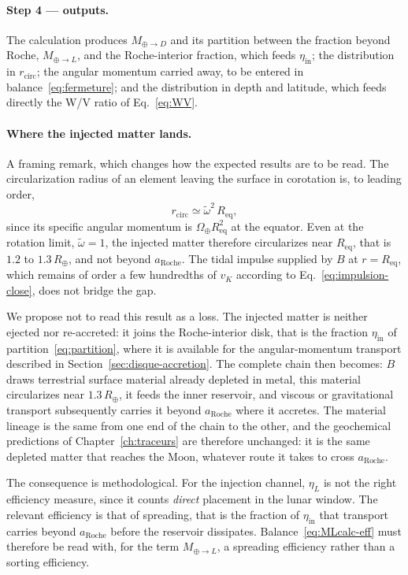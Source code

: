 \documentclass[11pt,a4paper,openany]{report}
\newcommand{\Rt}{R_{\oplus}}
\newcommand{\Req}{R_{\mathrm{eq}}}
\newcommand{\aR}{a_{\mathrm{Roche}}}
\begin{document}
\paragraph{Step 4 --- outputs.} The calculation produces $M_{\oplus\to D}$ and its partition between
the fraction beyond Roche, $M_{\oplus\to L}$, and the Roche-interior fraction, which feeds
$\eta_{\mathrm{in}}$; the distribution in $r_{\mathrm{circ}}$; the angular momentum carried away, to
be entered in balance~\eqref{eq:fermeture}; and the distribution in depth and latitude, which feeds
directly the W/V ratio of Eq.~\eqref{eq:WV}.

\paragraph{Where the injected matter lands.} A framing remark, which changes how the expected
results are to be read. The circularization radius of an element leaving the surface in corotation
is, to leading order,
\begin{equation}
r_{\mathrm{circ}}\simeq\tilde\omega^2\,\Req,
\label{eq:rcirc-corot}
\end{equation}
since its specific angular momentum is $\Omega_\oplus\Req^2$ at the equator. Even at the rotation
limit, $\tilde\omega=1$, the injected matter therefore circularizes near $\Req$, that is
$1.2$ to $1.3\,\Rt$, and not beyond $\aR$. The tidal impulse supplied by $B$ at $r=\Req$, which
remains of order a few hundredths of $v_K$ according to Eq.~\eqref{eq:impulsion-close}, does not
bridge the gap.

We propose not to read this result as a loss. The injected matter is neither ejected nor
re-accreted: it joins the Roche-interior disk, that is the fraction $\eta_{\mathrm{in}}$ of
partition~\eqref{eq:partition}, where it is available for the angular-momentum transport described
in Section~\ref{sec:disque-accretion}. The complete chain then becomes: $B$ draws terrestrial
surface material already depleted in metal, this material circularizes near $1.3\,\Rt$, it feeds the
inner reservoir, and viscous or gravitational transport subsequently carries it beyond $\aR$ where
it accretes. The material lineage is the same from one end of the chain to the other, and the
geochemical predictions of Chapter~\ref{ch:traceurs} are therefore unchanged: it is the same
depleted matter that reaches the Moon, whatever route it takes to cross $\aR$.

The consequence is methodological. For the injection channel, $\eta_L$ is not the right efficiency
measure, since it counts \emph{direct} placement in the lunar window. The relevant efficiency is
that of spreading, that is the fraction of $\eta_{\mathrm{in}}$ that transport carries beyond $\aR$
before the reservoir dissipates. Balance~\eqref{eq:MLcalc-eff} must therefore be read with, for the
term $M_{\oplus\to L}$, a spreading efficiency rather than a sorting efficiency.
\end{document}
